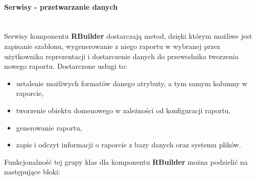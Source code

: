 	\paragraph{Serwisy - przetwarzanie danych}  					\hspace{0pt} \\
		Serwisy komponentu \textbf{RBuilder} dostarczają metod, dzięki którym możliwe jest zapisanie szablonu, wygenerowanie z niego raportu 
	w wybranej przez użytkownika reprezentacji i dostarczenie danych do przewodnika tworzenia nowego raportu. Dostarczone usługi to:
	\begin{itemize}
		\item ustalenie możliwych formatów danego atrybuty, a tym samym kolumny w raporcie,
		\item tworzenie obiektu domenowego w zależności od konfiguracji raportu,
		\item generowanie raportu,
		\item zapis i odczyt informacji o raporcie z bazy danych oraz systemu plików.
	\end{itemize}
	Funkcjonalność tej grupy klas dla komponentu \textbf{RBuilder} można podzielić na następujące bloki:
